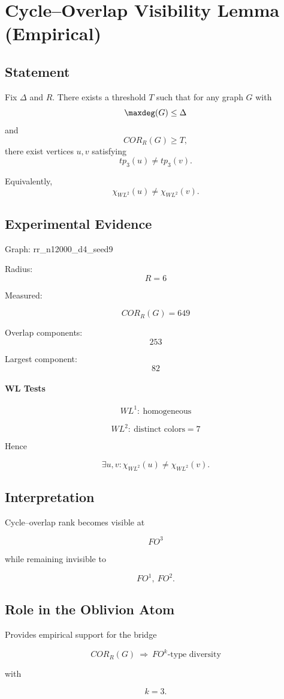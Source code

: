 \section{Cycle--Overlap Visibility Lemma (Empirical)}

\subsection*{Statement}

Fix $\Delta$ and $R$.  
There exists a threshold $T$ such that for any graph $G$ with
\[
\maxdeg(G)\le \Delta
\]
and
\[
COR_R(G)\ge T,
\]
there exist vertices $u,v$ satisfying
\[
tp_3(u)\ne tp_3(v).
\]

Equivalently,
\[
\chi_{WL^2}(u)\ne \chi_{WL^2}(v).
\]

\subsection*{Experimental Evidence}

Graph: rr\_n12000\_d4\_seed9

Radius:
\[
R=6
\]

Measured:

\[
COR_R(G)=649
\]

Overlap components:
\[
253
\]

Largest component:
\[
82
\]

\paragraph{WL Tests}

\[
WL^1:\ \text{homogeneous}
\]

\[
WL^2:\ \text{distinct colors} = 7
\]

Hence

\[
\exists u,v:\chi_{WL^2}(u)\ne\chi_{WL^2}(v).
\]

\subsection*{Interpretation}

Cycle–overlap rank becomes visible at

\[
FO^3
\]

while remaining invisible to

\[
FO^1,\ FO^2.
\]

\subsection*{Role in the Oblivion Atom}

Provides empirical support for the bridge

\[
COR_R(G)\ \Rightarrow\ FO^k\text{-type diversity}
\]

with

\[
k=3.
\]

